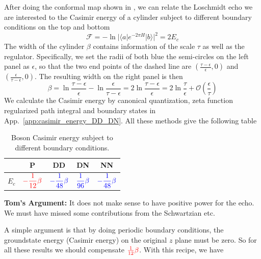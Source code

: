 \documentclass{article}
\begin{document}


After doing the conformal map shown in \label{fig:fig_H}, we can relate the Loschmidt echo we are interested to the Casimir energy of a cylinder subject to different boundary conditions on the top and bottom
\begin{equation}
\mathcal{F} = - \ln |\langle a | e^{- 2\pi H} | b \rangle |^2 = 2 E_c 
\end{equation}
The width of the cylinder $\beta$ contains information of the scale $\tau$ as well as the regulator. Specifically, we set the radii of both blue the semi-circles on the left panel as $\epsilon$, so that the two end points of the dashed line are $(\frac{\tau - \epsilon}{\epsilon}, 0 )$ and $ (\frac{\epsilon}{ \tau - \epsilon}, 0 )$. The resulting width on the right panel is then
\begin{equation}
\beta  = \ln  \frac{\tau - \epsilon}{\epsilon} -  \ln \frac{\epsilon}{ \tau - \epsilon}  = 2 \ln \frac{\tau - \epsilon}{ \epsilon} 
= 2 \ln \frac{\tau}{\epsilon} + \mathcal{O}(\frac{\epsilon}{\tau})
\end{equation}
We calculate the Casimir energy by canonical quantization, zeta function regularized path integral and boundary states in App.~\ref{app:casimir_energy_DD_DN}. All these methods give the following table
\begin{table}[h]
\begin{center}
\begin{tabular}{ |c|c|c|c|c| } 
 \hline
  & P & DD & DN & NN \\ \hline  \rule[4ex]{0pt}{1pt}
  $E_c $ & $ {\color{red} - \dfrac{1}{12}\beta } $ & ${\color{blue}- \dfrac{1}{48} \beta }$ & ${\color{blue} \dfrac{1}{96} \beta }$ &  ${\color{blue}- \dfrac{1}{48} \beta }$ \\[2ex]
 \hline
\end{tabular}
\end{center}
\caption{Boson Casimir energy subject to different boundary conditions.}
\label{tab:casimir}
\end{table}

{\bf Tom's Argument: } It does not make sense to have positive power for the echo. We must have missed some contributions from the Schwartzian etc. 

A simple argument is that by doing periodic boundary conditions, the groundstate energy (Casimir energy) on the original $z$ plane must be zero. So for all these results we should compensate ${\color{red}\frac{1}{12}\beta}$. With this recipe, we have
\end{document}
